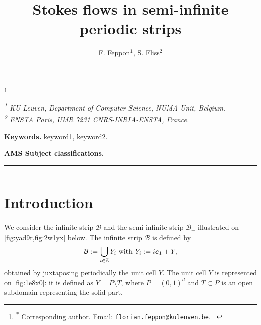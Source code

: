 \documentclass[a4paper,10pt,reqno]{amsart}
\begin{document}
\title{ Stokes flows in semi-infinite periodic strips }
\author{F. Feppon$^{1}$, S. Fliss$^{2}$}
\thanks{\hspace*{0.3em}\textsuperscript{$*$} Corresponding author. Email:
\texttt{florian.feppon@kuleuven.be}. \
\hspace*{\parindent}
}

\maketitle


\vspace{-2em}
\begin{center}
\emph{\textsuperscript{1} KU Leuven, Department of Computer Science, NUMA Unit,
    Belgium.}\\
    \emph{\textsuperscript{2} ENSTA Paris, UMR 7231 CNRS-INRIA-ENSTA,
    France.}
\end{center}

\begin{abstract} 
\end{abstract} 
\medskip  
\noindent \textbf{Keywords.} keyword1, keyword2. 

\medskip
\noindent \textbf{AMS Subject classifications.}  \par
\medskip
\bigskip
\hrule
\tableofcontents
\vspace{-0.5cm}
\hrule
\medskip
\bigskip
\section{Introduction}
    
We consider the infinite strip $\mathcal{B}$ and the semi-infinite strip $\mathcal{B}_+$ illustrated    
on \cref{fig:yad9r,fig:2w1yx} below.
The infinite strip $\mathcal{B}$ is defined by
\[
\mathcal{B}:= \bigcup_{i\in\mathbb{Z}} Y_i \text{ with }Y_i:=i{\bm e}_1 + Y,
\]     
 obtained by juxtaposing periodically
the unit cell $Y$.     
The unit cell $Y$ is represented on \cref{fig:1e8x0}:    
it is defined as $Y=P\setminus \bar T$, where $P=(0,1)^{d}$     
and $T\subset P$ is an open subdomain representing     
the solid part. 
\end{document}

